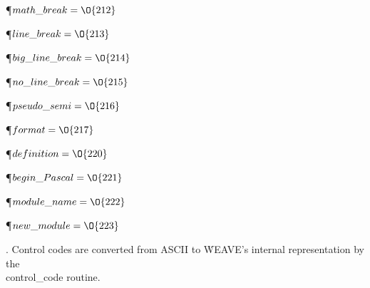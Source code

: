 \P\D {}$\\{math\_break}=\O{212}$\par
\P\D {}$\\{line\_break}=\O{213}$\par
\P\D {}$\\{big\_line\_break}=\O{214}$\par
\P\D {}$\\{no\_line\_break}=\O{215}$\par
\P\D {}$\\{pseudo\_semi}=\O{216}$\par
\P\D {}$\\{format}=\O{217}$\par
\P\D {}$\\{definition}=\O{220}$\par
\P\D {}$\\{begin\_Pascal}=\O{221}$\par
\P\D {}$\\{module\_name}=\O{222}$\par
\P\D {}$\\{new\_module}=\O{223}$\par
\fi

. Control codes are converted from ASCII to \.{WEAVE}'s internal
representation by the \\{control\_code} routine.

